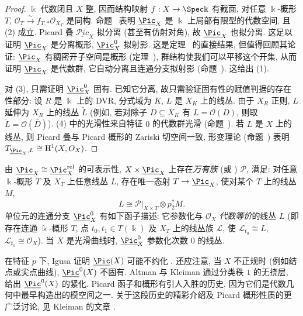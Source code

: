 \begin{proof}
$\Bbbk$ 代数闭且 $X$ 整, 因而结构映射 $f:X\to\Spec\Bbbk$ 有截面, 对任意 $\Bbbk$-概形 $T$, $\mathcal O_T\xrightarrow{\sim}f_{T,*}\mathcal O_{X_T}$ 是同构. 命题~ 表明 $\underline{\Pic}_X$ 是 $\Bbbk$ 上局部有限型的代数空间, 且 (2) 成立. Picard 叠 $\underline{\mathcal P\!ic}_X$ 拟分离 (甚至有仿射对角), 故 $\underline{\Pic}_X$ 也拟分离. 这足以证明 $\underline{\Pic}_X$ 是分离概形, $\underline{\Pic}_X^0$ 拟射影. 这是定理~ 的直接结果, 但值得回顾其论证: $\underline{\Pic}_X$ 有稠密开子空间是概形 (定理~), 群结构使我们可以平移这个开集, 从而证明 $\underline{\Pic}_X$ 是代数群, 它自动分离且连通分支拟射影 (命题~). 这给出 (1).

对 (3), 只需证明 $\underline{\Pic}_X^0$ 固有. 已知它分离, 故只需验证固有性的赋值判据的存在性部分: 设 $R$ 是 $\Bbbk$ 上的 DVR, 分式域为 $K$, $L$ 是 $X_K$ 上的线丛. 由于 $X_R$ 正则, $L$ 延伸为 $X_R$ 上的线丛 $\widetilde L$ (例如, 若对除子 $D\subseteq X_K$ 有 $L=\mathcal O(D)$, 则取 $\widetilde L=\mathcal O(\overline D)$). (4) 中的光滑性来自特征 $0$ 的代数群光滑 (命题~). 若 $L$ 是 $X$ 上的线丛, 则 Picard 叠与 Picard 概形的 Zariski 切空间一致, 形变理论 (命题~) 表明 $T_{\underline{\Pic}_X,L}\cong\mathrm H^1(X,\mathcal O_X)$.
\end{proof}
\begin{remark}\label{src:7.4.66}
由 $\underline{\Pic}_X\cong\underline{\Pic}_X^{\mathrm{rel}}$ 的可表示性, $X\times\underline{\Pic}_X$ 上存在\emph{万有族} (或 ) $\mathcal P$, 满足: 对任意 $\Bbbk$-概形 $T$ 及 $X_T$ 上任意线丛 $L$, 存在唯一态射 $T\to\underline{\Pic}_X$, 使对某个 $T$ 上的线丛 $M$,
\[
L\cong\mathcal P|_{X\times T}\otimes p_2^*M.
\]
单位元的连通分支 $\underline{\Pic}_X^0$ 有如下函子描述: 它参数化与 $\mathcal O_X$ \emph{代数等价}的线丛 $L$ (即存在连通 $\Bbbk$-概形 $T$, 点 $t_0,t_1\in T(\Bbbk)$ 及 $X_T$ 上的线丛族 $\mathcal L$, 使 $\mathcal L_{t_0}\cong L$, $\mathcal L_{t_1}\cong\mathcal O_X$). 当 $X$ 是光滑曲线时, $\underline{\Pic}_X^0$ 参数化次数 $0$ 的线丛.
\end{remark}
\begin{remark}\label{src:7.4.67}
在特征 $p$ 下, Igusa 证明 $\underline{\Pic}(X)$ 可能不约化 \cite{Igu55}. 还应注意, 当 $X$ 不正规时 (例如结点或尖点曲线), $\underline{\Pic}^0(X)$ 不固有. Altman 与 Kleiman \cite{AK80} 通过分类秩 $1$ 的无挠层, 给出 $\underline{\Pic}^0(X)$ 的紧化. Picard 函子和概形有引人入胜的历史, 因为它们是代数几何中最早构造出的模空间之一. 关于这段历史的精彩介绍及 Picard 概形性质的更广泛讨论, 见 Kleiman 的文章 \cite{Kle05}.
\end{remark}

